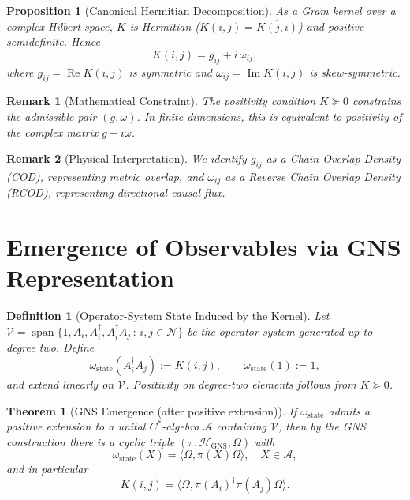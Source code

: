 \documentclass[11pt, a4paper]{article}
\newtheorem{definition}{Definition}
\newtheorem{theorem}{Theorem}
\newtheorem{proposition}{Proposition}
\newtheorem{remark}{Remark}
\begin{document}
\begin{proposition}[Canonical Hermitian Decomposition]
As a Gram kernel over a complex Hilbert space, $K$ is Hermitian ($K(i,j)=\overline{K(j,i)}$) and positive semidefinite. Hence
\begin{equation}
    K(i,j) = g_{ij} + i\,\omega_{ij},
\end{equation}
where $g_{ij}=\operatorname{Re}K(i,j)$ is symmetric and $\omega_{ij}=\operatorname{Im}K(i,j)$ is skew-symmetric.
\end{proposition}

\begin{remark}[Mathematical Constraint]
The positivity condition $K \succeq 0$ constrains the admissible pair $(g,\omega)$. In finite dimensions, this is equivalent to positivity of the complex matrix $g+i\omega$.
\end{remark}

\begin{remark}[Physical Interpretation]
We identify $g_{ij}$ as a Chain Overlap Density (COD), representing metric overlap, and $\omega_{ij}$ as a Reverse Chain Overlap Density (RCOD), representing directional causal flux.
\end{remark}

\section{Emergence of Observables via GNS Representation}

\begin{definition}[Operator-System State Induced by the Kernel]
Let $\mathcal{V}=\operatorname{span}\{1,A_i,A_i^\dagger, A_i^\dagger A_j\,:\, i,j\in\mathcal{N}\}$ be the operator system generated up to degree two. Define
\begin{equation}
\omega_{\mathrm{state}}(A_i^\dagger A_j):=K(i,j), \qquad \omega_{\mathrm{state}}(1):=1,
\end{equation}
and extend linearly on $\mathcal{V}$. Positivity on degree-two elements follows from $K\succeq 0$.
\end{definition}

\begin{theorem}[GNS Emergence (after positive extension)]
If $\omega_{\mathrm{state}}$ admits a positive extension to a unital $C^*$-algebra $\mathcal{A}$ containing $\mathcal{V}$, then by the GNS construction there is a cyclic triple $(\pi,\mathcal{H}_{\mathrm{GNS}},\Omega)$ with
\begin{equation}
    \omega_{\mathrm{state}}(X)=\langle \Omega,\pi(X)\Omega\rangle, \quad X\in\mathcal{A},
\end{equation}
and in particular
\begin{equation}
    K(i,j)=\langle \Omega,\pi(A_i)^\dagger\pi(A_j)\Omega\rangle.
\end{equation}
\end{theorem}
\end{document}
